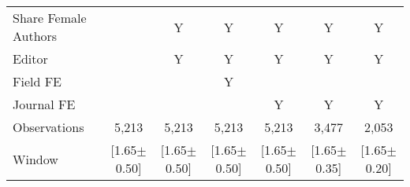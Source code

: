 \begin{tabular}{l*{6}{c}}
Share Female Authors &         &        Y&        Y&        Y&        Y&        Y\\
Editor          &         &        Y&        Y&        Y&        Y&        Y\\
Field FE        &         &         &        Y&         &         &         \\
Journal FE      &         &         &         &        Y&        Y&        Y\\
\hline
Observations    &    5,213&    5,213&    5,213&    5,213&    3,477&    2,053\\
Window          &[1.65$\pm$0.50]&[1.65$\pm$0.50]&[1.65$\pm$0.50]&[1.65$\pm$0.50]&[1.65$\pm$0.35]&[1.65$\pm$0.20]\\
\hline\hline
\end{tabular}
